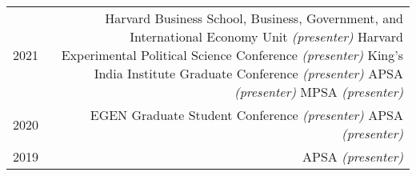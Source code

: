 \begin{tabular}{L!{\VRule}R}
 	2021 & Harvard Business School, Business, Government, and International Economy Unit \textit{(presenter)} \newline 
 	Harvard Experimental Political Science Conference \textit{(presenter)} \newline 
 	King’s India Institute Graduate Conference \textit{(presenter)} \newline 
 	APSA \textit{(presenter)} \newline 
 	MPSA \textit{(presenter)} \\
 	
 	2020 & EGEN Graduate Student Conference \textit{(presenter)} \newline 
 	APSA \textit{(presenter)} \\
 	
 	2019 & APSA \textit{(presenter)} \\
 	
 \end{tabular}
 